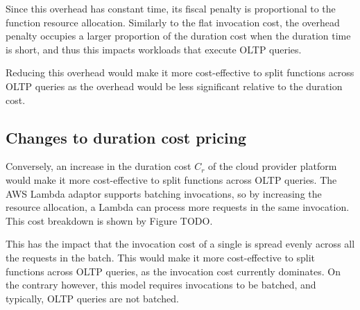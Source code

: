 Since this overhead has constant time, its fiscal penalty is proportional to the function resource allocation. Similarly to the flat invocation cost, the overhead penalty occupies a larger proportion of the duration cost when the duration time is short, and thus this impacts workloads that execute OLTP queries.

Reducing this overhead would make it more cost-effective to split functions across OLTP queries as the overhead would be less significant relative to the duration cost.

\subsection{Changes to duration cost pricing}
Conversely, an increase in the duration cost $C_r$ of the cloud provider platform would make it more cost-effective to split functions across OLTP queries. The \faaasc{} AWS Lambda adaptor supports batching invocations, so by increasing the resource allocation, a Lambda can process more requests in the same invocation. This cost breakdown is shown by Figure TODO.

This has the impact that the invocation cost of a single is spread evenly across all the requests in the batch. This would make it more cost-effective to split functions across OLTP queries, as the invocation cost currently dominates. On the contrary however, this model requires invocations to be batched, and typically, OLTP queries are not batched.
